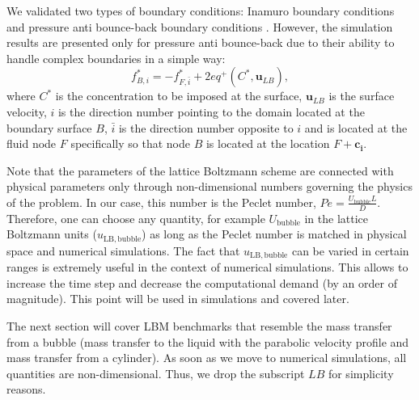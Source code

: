 \documentclass[review,12pt]{elsarticle}
\newcommand{\beq}{\begin{equation}}
\newcommand{\feq}{\end{equation}}
\newcommand{\ububble}{U_{\mathrm{bubble}}}
\newcommand{\cstar}{C^{*}}
\begin{document}
We validated
two types of boundary conditions: Inamuro boundary conditions \cite{inamuro-scalar-boundary} and
pressure anti bounce-back boundary conditions \cite{ginzburg-multireflection}. However, the
simulation results  are presented only for pressure anti bounce-back due to their ability
to handle complex boundaries in a simple way:
\beq
\label{antibb}
f^{*}_{B,i}=-f^{*}_{F,\bar{i}} + 2 eq^+(\cstar,\bm{u}_{LB}),
\feq
where $\cstar$ is the concentration to be imposed at the surface, $\bm{u}_{LB}$ is the surface velocity,
$i$ is the direction number pointing to the domain located at the boundary surface $B$,
$\bar{i}$ is the direction number opposite to $i$ and is located at the fluid node $F$ specifically
so that node $B$ is located at the location $F+\bm{c_i}$. 

Note that the parameters of the lattice
Boltzmann scheme are connected with  physical parameters only through  non-dimensional
numbers governing the physics of the problem. In our case, this number is the Peclet number, $Pe=\frac{\ububble L}{D}$.
Therefore, one can choose any quantity, for example 
$\ububble$ in the lattice Boltzmann units ($u_{\mathrm{LB,bubble}}$) as long as the
Peclet number is  matched in physical space and numerical simulations. The fact that $u_{\mathrm{LB,bubble}}$
can be varied in certain ranges is extremely useful in the context of numerical simulations. This allows to 
increase the time step and decrease the computational demand (by an order of magnitude). 
This point will be used in simulations and covered later. 

The next section will cover LBM benchmarks that resemble the mass transfer from a bubble 
(mass transfer to the liquid with the parabolic velocity profile  and mass transfer from a cylinder). 
{\color{red} As soon as we move to numerical simulations, all quantities are non-dimensional. Thus, we drop the subscript $LB$ for simplicity reasons.}
\end{document}
